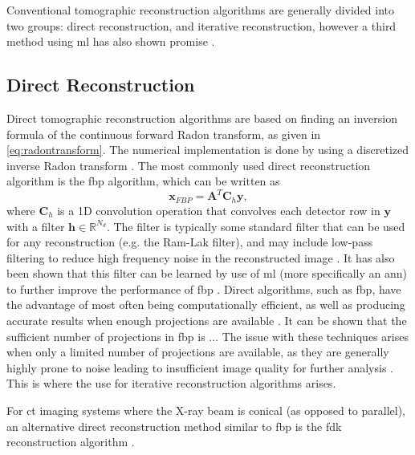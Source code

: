 Conventional tomographic reconstruction algorithms are generally divided into two groups: direct reconstruction, and iterative reconstruction, however a third method using \gls{ml} has also shown promise \cite{GANrec}.

\subsection{Direct Reconstruction}
Direct tomographic reconstruction algorithms are based on finding an inversion formula of the continuous forward Radon transform, as given in \cref{eq:radontransform}. The numerical implementation is done by using a discretized inverse Radon transform \cite{jimaging4110128}. The most commonly used direct reconstruction algorithm is the \gls{fbp} algorithm, which can be written as \cite{jimaging4110128}
\begin{equation}
    \label{eq:fbp}
    \bm{x}_{FBP} = \bm{A}^T \bm{C}_h \bm{y},
\end{equation}
where $\bm{C}_h$ is a 1D convolution operation that convolves each detector row in $\bm{y}$ with a filter $\bm{h} \in \mathbb{R}^{N_d}$. The filter is typically some standard filter that can be used for any reconstruction (e.g. the Ram-Lak filter), and may include low-pass filtering to reduce high frequency noise in the reconstructed image \cite{681991}. It has also been shown that this filter can be learned by use of \gls{ml} (more specifically an \gls{ann}) to further improve the performance of \gls{fbp} \cite{6607157}. 
Direct algorithms, such as \gls{fbp}, have the advantage of most often being computationally efficient, as well as producing accurate results when enough projections are available \cite{jimaging4110128}. It can be shown that the sufficient number of projections in \gls{fbp} is ... The issue with these techniques arises when only a limited number of projections are available, as they are generally highly prone to noise leading to insufficient image quality for further analysis \cite{jimaging4110128}. This is where the use for iterative reconstruction algorithms arises.

For \gls{ct} imaging systems where the X-ray beam is conical (as opposed to parallel), an alternative direct reconstruction method similar to \gls{fbp} is the \gls{fdk} reconstruction algorithm \cite{Feldkamp:84}. 


